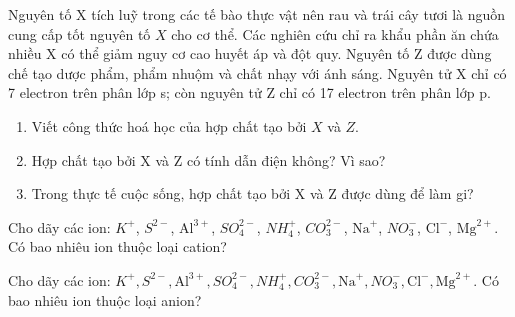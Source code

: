 \begin{bt}
	Nguyên tố X tích luỹ trong các tế bào thực vật nên rau và trái cây tươi là nguồn cung cấp tốt nguyên tố $X$ cho cơ thể. Các nghiên cứu chỉ ra khẩu phần ăn chứa nhiều X có thể giảm nguy cơ cao huyết áp và đột quy. Nguyên tố Z được dùng chế tạo dược phẩm, phẩm nhuộm và chất nhạy với ánh sáng. Nguyên tử X chỉ có 7 electron trên phân lớp s; còn nguyên tử Z chỉ có 17 electron trên phân lớp p.
	\begin{enumerate}
		\item Viết công thức hoá học của hợp chất tạo bởi $X$ và $Z$.
		\item Hợp chất tạo bởi X và Z có tính dẫn điện không? Vì sao?
		\item Trong thực tế cuộc sống, hợp chất tạo bởi X và Z được dùng để làm gi?
	\end{enumerate}
\end{bt}

\begin{bt}
	Cho dãy các ion: $K^{+}$, $S^{2-}$, $\mathrm{Al}^{3+}$, $SO_4^{2-}$, $NH_4^{+}$, $CO_3^{2-}$, $\mathrm{Na}^{+}$, $NO_3^{-}$, $\mathrm{Cl}^{-}$, $\mathrm{Mg}^{2+}$. Có bao nhiêu ion thuộc loại cation?
	\shortans{}
	\loigiai{}
\end{bt}

\begin{bt}
	Cho dãy các ion: $K^{+}, S^{2-}, \mathrm{Al}^{3+}, SO_4^{2-}, NH_4^{+}, CO_3^{2-}, \mathrm{Na}^{+}, NO_3^{-}, \mathrm{Cl}^{-}, \mathrm{Mg}^{2+}$. Có bao nhiêu ion thuộc loại anion?
	\shortans{}
	\loigiai{}
\end{bt}


